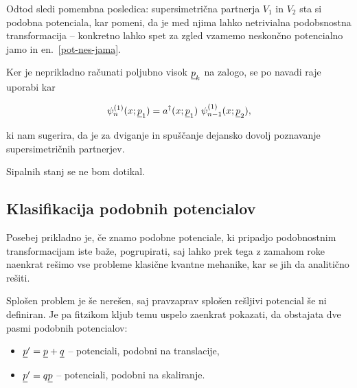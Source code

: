 Odtod sledi pomembna posledica: supersimetri\v cna partnerja $V_1$ in $V_2$ sta si podobna potenciala, kar
pomeni, da je med njima lahko netrivialna podobsnostna transformacija -- konkretno lahko spet za zgled vzamemo
neskon\v cno potencialno jamo in en.~\eqref{pot-nes-jama}.

Ker je neprikladno ra\v cunati poljubno visok $\underline{p}_k$ na zalogo, se po navadi raje uporabi kar

\begin{equation}
	\psi^{(1)}_n (x; \underline{p}_1) = a^\dagger (x; \underline{p}_1)\ \psi_{n-1}^{(1)} (x; \underline{p}_2),
\end{equation}

ki nam sugerira, da je za dviganje in spu\v s\v canje dejansko dovolj poznavanje supersimetri\v cnih
partnerjev.

Sipalnih stanj se ne bom dotikal.

\subsection{Klasifikacija podobnih potencialov}

Posebej prikladno je, \v ce znamo podobne potenciale, ki pripadjo podobnostnim transformacijam iste ba\v ze,
pogrupirati, saj lahko prek tega z zamahom roke naenkrat re\v simo vse probleme klasi\v cne kvantne mehanike,
kar se jih da analiti\v cno re\v siti.

Splo\v sen problem je \v se nere\v sen, saj pravzaprav splo\v sen re\v sljivi potencial \v se ni definiran.
Je pa fitzikom kljub temu uspelo zaenkrat pokazati, da obstajata dve pasmi podobnih potencialov:

\begin{itemize}
	\item{$\underline{p}^\prime = \underline{p} + \underline{q}$ -- potenciali, podobni na translacije,}
	\item{$\underline{p}^\prime = q\underline{p}$ -- potenciali, podobni na skaliranje.}
\end{itemize}
